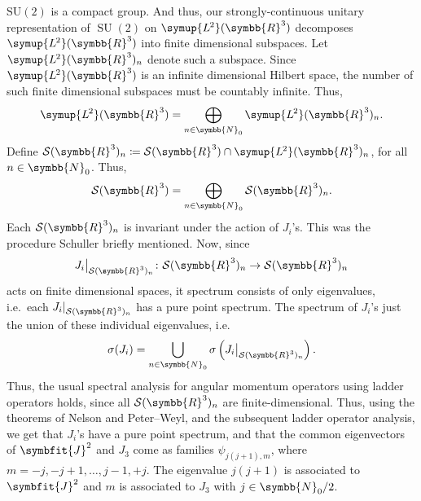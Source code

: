 \documentclass[12pt, a4 paper]{article}
\let\symcal\mathcal
\theoremstyle{definition}
\newcommand{\ltwo}{\symup{L\kern-0.5pt^2}}
\newcommand{\ltworthree}{\ltwo(\rr^3)}
\newcommand{\rr}{\symbb{R}}
\newcommand{\nn}{\symbb{N}_0}
\newcommand{\schwartz}{\symcal{S}}
\newcommand{\schwartzrthree}{\schwartz(\rr^3)}
\newcommand{\spec}{\sigma}
\newcommand{\SUtwo}{\operatorname{SU}(2)}
\newcommand\restr[2]{{%
        \left.\kern-\nulldelimiterspace %
        #1 %
        \littletaller %
        \right|_{#2} %
    }}
\newcommand{\littletaller}{\mathchoice{\vphantom{\big|}}{}{}{}}
\begin{document}
    \(\operatorname{SU(2)}\) is a compact group. And thus, our strongly-continuous unitary representation of \(\SUtwo\) on \(\ltworthree\) decomposes \(\ltworthree\) into finite dimensional subspaces. Let \(\ltworthree_n\) denote such a subspace. Since \(\ltworthree\) is an infinite dimensional Hilbert space, the number of such finite dimensional subspaces must be countably infinite. Thus,
    \[
        \ltworthree = \bigoplus_{n \in \nn} \ltworthree_n.
    \]
    Define \(\schwartzrthree_n \coloneq \schwartzrthree \cap \ltworthree_n\), for all \(n \in \nn\). Thus,
    \[
    \schwartzrthree = \bigoplus_{n \in \nn} \schwartzrthree_n.
    \]
    Each \(\schwartzrthree_n\) is invariant under the action of \(J_i\)'s. This was the procedure Schuller briefly mentioned. Now, since \[\restr{J_i}{\schwartzrthree_n} \colon \schwartzrthree_n \rightarrow \schwartzrthree_n\] acts on finite dimensional spaces, it spectrum consists of only eigenvalues, i.e.\ each \(\restr{J_i}{\schwartzrthree_n}\) has a pure point spectrum. The spectrum of \(J_i\)'s just the union of these individual eigenvalues, i.e.\
    \[
        \spec(J_i) = \bigcup_{n \in \nn} \spec\left(\restr{J_i}{\schwartzrthree_n}\right).
    \]
    Thus, the usual spectral analysis for angular momentum operators using ladder operators holds, since all \(\schwartzrthree_n\) are finite-dimensional. Thus, using the theorems of Nelson and Peter--Weyl, and the subsequent ladder operator analysis, we get that $J_i$'s have a pure point spectrum, and that the common eigenvectors of $\symbfit{J}^2$ and $J_3$ come as families $\psi_{j(j+1), m}$, where $m = -j, -j+1, \ldots, j-1, +j$. The eigenvalue $j(j+1)$ is associated to $\symbfit{J}^2$ and $m$ is associated to $J_3$ with $j \in \symbb{N}_0/2$.
\end{document}
